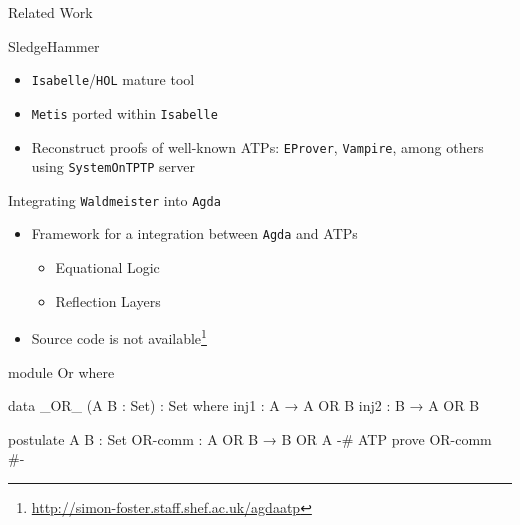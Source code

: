 \documentclass[xetex, hyperref={pdfpagelabels=false}]{beamer}
\begin{document}
\begin{frame}[fragile, label=hammer]{Related Work}
\begin{block}{SledgeHammer} \citep{Paulson2007}
\begin{itemize}
\item \texttt{Isabelle}/\texttt{HOL} mature tool
\item \texttt{Metis} ported within \texttt{Isabelle}
\item Reconstruct proofs of well-known ATPs: \texttt{EProver}, \texttt{Vampire},
among others using \texttt{SystemOnTPTP} server
\end{itemize}
\end{block}

\begin{block}{Integrating \texttt{Waldmeister} into \texttt{Agda}} \citep{Foster2011}
\begin{itemize}
  \item Framework for a integration between \texttt{Agda} and ATPs
  \begin{itemize}
    \item Equational Logic
    \item Reflection Layers
  \end{itemize}
  \item Source code is not available\footnote{\url{http://simon-foster.staff.shef.ac.uk/agdaatp}}
  \end{itemize}
\end{block}
\end{frame}


\begin{lrbox}{\agdapragma}
\begin{agda}
module Or where

data _OR_ (A B : Set) : Set where
  inj1 : A → A OR B
  inj2 : B → A OR B

postulate
  A B    : Set
  OR-comm : A OR B → B OR A
{-# ATP prove OR-comm #-}
\end{agda}
\end{lrbox}
\end{document}
